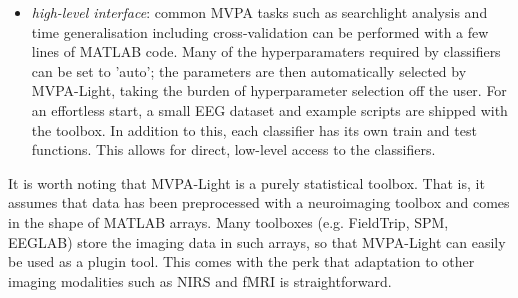 \documentclass[utf8]{frontiersSCNS} %
\begin{document}
\begin{itemize}
\item \textit{high-level interface}: common MVPA tasks such as searchlight analysis and time generalisation including cross-validation can be performed with a few lines of MATLAB code. Many of the hyperparamaters required by classifiers can be set to 'auto'; the parameters are then automatically selected by MVPA-Light, taking the burden of hyperparameter selection off the user. For an effortless start, a small EEG dataset and example scripts are shipped with the toolbox. In addition to this, each classifier has its own train and test functions. This allows for direct, low-level access to the classifiers. 
\end{itemize}

It is worth noting that MVPA-Light is a purely statistical toolbox. That is, it assumes that data has been preprocessed with a neuroimaging toolbox and comes in the shape of MATLAB arrays. Many toolboxes (e.g. FieldTrip, SPM, EEGLAB) store the imaging  data in such arrays, so that MVPA-Light can easily be used as a plugin tool. This comes with the perk that adaptation to other imaging modalities such as NIRS and fMRI is straightforward.



\end{document}
